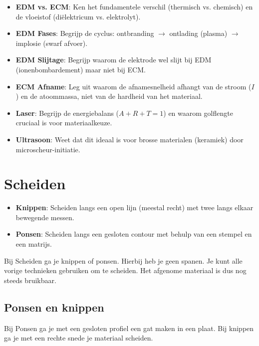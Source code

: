 \documentclass[a4paper,12pt,twoside]{report}
\begin{document}
\begin{warningbox}[title=EXAMEN CHECKLIST: NIET-CONVENTIONELE BEWERKINGEN]
    \begin{itemize}
        \item \textbf{EDM vs. ECM}: Ken het fundamentele verschil (thermisch vs. chemisch) en de vloeistof (diëlektricum vs. elektrolyt).
        \item \textbf{EDM Fases}: Begrijp de cyclus: ontbranding $\to$ ontlading (plasma) $\to$ implosie (swarf afvoer).
        \item \textbf{EDM Slijtage}: Begrijp waarom de elektrode wel slijt bij EDM (ionenbombardement) maar niet bij ECM.
        \item \textbf{ECM Afname}: Leg uit waarom de afnamesnelheid afhangt van de stroom ($I$) en de atoommassa, niet van de hardheid van het materiaal.
        \item \textbf{Laser}: Begrijp de energiebalans ($A+R+T=1$) en waarom golflengte cruciaal is voor materiaalkeuze.
        \item \textbf{Ultrasoon}: Weet dat dit ideaal is voor brosse materialen (keramiek) door microscheur-initiatie.
    \end{itemize}
\end{warningbox}

\chapter{Scheiden}

\begin{conceptbox}[title=Knippen vs. Ponsen]
    \begin{itemize}
        \item \textbf{Knippen}: Scheiden langs een open lijn (meestal recht) met twee langs elkaar bewegende messen.
        \item \textbf{Ponsen}: Scheiden langs een gesloten contour met behulp van een stempel en een matrijs.
    \end{itemize}
\end{conceptbox}

Bij Scheiden ga je knippen of ponsen. Hierbij heb je geen spanen.
Je kunt alle vorige technieken gebruiken om te scheiden.
Het afgenome materiaal is dus nog steeds bruikbaar.
\newline
\section{Ponsen en knippen}
Bij Ponsen ga je met een gesloten profiel een gat maken in een plaat.
\newline
Bij knippen ga je met een rechte snede je materiaal scheiden.
\newline
\end{document}
